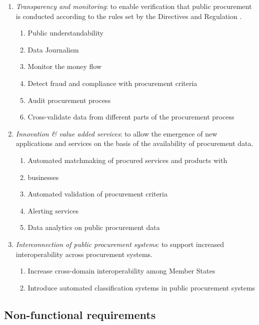 	\begin{enumerate}
		\item \textit{Transparency and monitoring}: to enable verification that public procurement is conducted according to the rules set by the Directives and Regulation \citep{directive-2014/23/EU,directive-2014/24/EU,directive-2014/25/EU,directive-2014/55/EU}.
		\begin{enumerate}
			\item Public understandability
			\item Data Journalism
			\item Monitor the money flow
			\item Detect fraud and compliance with procurement criteria
			\item Audit procurement process
			\item Cross-validate data from different parts of the procurement process			
		\end{enumerate}
		\item \textit{Innovation \& value added services}: to allow the emergence of new applications and services on the basis of the availability of procurement data.
		\begin{enumerate}
			\item Automated matchmaking of procured services and products with \item businesses
			\item Automated validation of procurement criteria
			\item Alerting services
			\item Data analytics on public procurement data			
		\end{enumerate}
		\item \textit{Interconnection of public procurement systems}: to support increased interoperability across procurement systems.
		\begin{enumerate}
			\item Increase cross-domain interoperability among Member States 
			\item Introduce automated classification systems in public procurement systems			
		\end{enumerate}
	\end{enumerate}
	
	
	\subsection{Non-functional requirements}
	\label{sec:non-functional-requirements}
	
